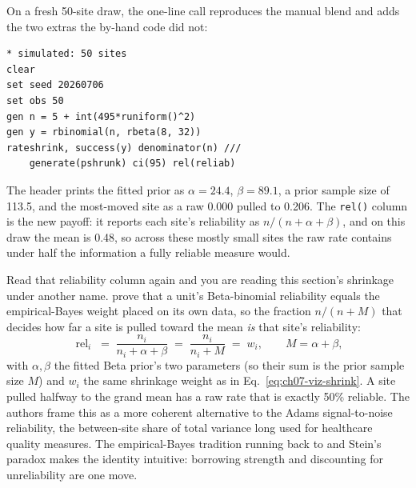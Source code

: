 \documentclass[
    a4paper,
    fontsize=10pt,
    twoside=true,
    numbers=noenddot,
]{kaobook}
\begin{document}
On a fresh 50-site draw, the one-line call reproduces the manual blend and adds the two extras the by-hand code did not:
\par
{\footnotesize
\begin{verbatim}
* simulated: 50 sites
clear
set seed 20260706
set obs 50
gen n = 5 + int(495*runiform()^2)
gen y = rbinomial(n, rbeta(8, 32))
rateshrink, success(y) denominator(n) ///
    generate(pshrunk) ci(95) rel(reliab)
\end{verbatim}
}
The header prints the fitted prior as $\alpha=24.4$, $\beta=89.1$, a prior sample size of 113.5, and the most-moved site as a raw 0.000 pulled to 0.206. The \texttt{rel()} column is the new payoff: it reports each site's reliability as $n/(n+\alpha+\beta)$, and on this draw the mean is 0.48, so across these mostly small sites the raw rate contains under half the information a fully reliable measure would.

Read that reliability column again and you are reading this section's shrinkage under another name. \textcite{field2026betabin} prove that a unit's Beta-binomial reliability equals the empirical-Bayes weight placed on its own data, so the fraction $n/(n+M)$ that decides how far a site is pulled toward the mean \emph{is} that site's reliability:
\begin{equation}
  \operatorname{rel}_i
    \;=\; \frac{n_i}{n_i + \alpha + \beta}
    \;=\; \frac{n_i}{n_i + M}
    \;=\; w_i,
  \qquad M = \alpha + \beta,
  \label{eq:ch07-viz-relid}
\end{equation}
with $\alpha,\beta$ the fitted Beta prior's two parameters (so their sum is the prior sample size $M$) and $w_i$ the same shrinkage weight as in Eq.~\eqref{eq:ch07-viz-shrink}. A site pulled halfway to the grand mean has a raw rate that is exactly 50\% reliable. The authors frame this as a more coherent alternative to the Adams signal-to-noise reliability, the between-site share of total variance long used for healthcare quality measures. The empirical-Bayes tradition running back to \textcite{efron1975data} and Stein's paradox makes the identity intuitive: borrowing strength and discounting for unreliability are one move.
\end{document}

